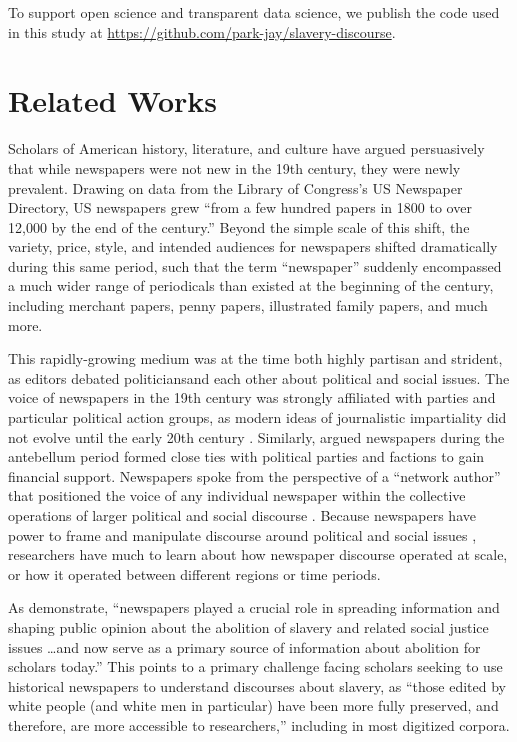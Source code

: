 \documentclass[11pt]{article}
\begin{document}
To support open science and transparent data science, we publish the code used in this study at \url{https://github.com/park-jay/slavery-discourse}.

\section{Related Works}

Scholars of American history, literature, and culture have argued persuasively that while newspapers were not new in the 19th century, they were newly prevalent.
Drawing on data from the Library of Congress's US Newspaper Directory, US newspapers grew ``from a few hundred papers in 1800 to over 12,000 by the end of the century.'' \cite{cordell2020going} 
Beyond the simple scale of this shift, the variety, price, style, and intended audiences for newspapers shifted dramatically during this same period, such that the term ``newspaper'' suddenly encompassed a much wider range of periodicals than existed at the beginning of the century, including merchant papers, penny papers, illustrated family papers, and much more.

This rapidly-growing medium was at the time both highly partisan and strident, as editors debated politiciansand each other about political and social issues. 
The voice of newspapers in the 19th century was strongly affiliated with parties and particular political action groups, as modern ideas of journalistic impartiality did not evolve until the early 20th century \citep{pasley_tyranny_2002}. 
Similarly, \citet{baldasty_commercialization_1992} argued newspapers during the antebellum period formed close ties with political parties and factions to gain financial support. Newspapers spoke from the perspective of a ``network author'' that positioned the voice of any individual newspaper within the collective operations of larger political and social discourse \citep{cordell_reprinting_2015}.
Because newspapers have power to frame and manipulate discourse around political and social issues \citep{willaert2022tracking}, researchers have much to learn about how newspaper discourse operated at scale, or how it operated between different regions or time periods.

As \citet{soni2021abolitionist} demonstrate, ``newspapers played a crucial role in spreading information and shaping public opinion about the abolition of slavery and related social justice issues \dots and now serve as a primary source of information about abolition for scholars today.''
This points to a primary challenge facing scholars seeking to use historical newspapers to understand discourses about slavery, as ``those edited by white people (and white men in particular) have been more fully preserved, and therefore, are more accessible to researchers,'' including in most digitized corpora. 
\end{document}
